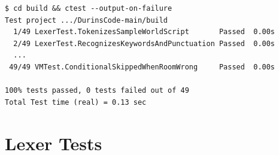 \documentclass[12pt, a4paper]{article}
\begin{document}
\begin{lstlisting}[style=bash, caption={ctest output (abbreviated)}]
$ cd build && ctest --output-on-failure
Test project .../DurinsCode-main/build
  1/49 LexerTest.TokenizesSampleWorldScript       Passed  0.00s
  2/49 LexerTest.RecognizesKeywordsAndPunctuation Passed  0.00s
  ...
 49/49 VMTest.ConditionalSkippedWhenRoomWrong     Passed  0.00s

100% tests passed, 0 tests failed out of 49
Total Test time (real) = 0.13 sec
\end{lstlisting}

\section{Lexer Tests}
\end{document}
